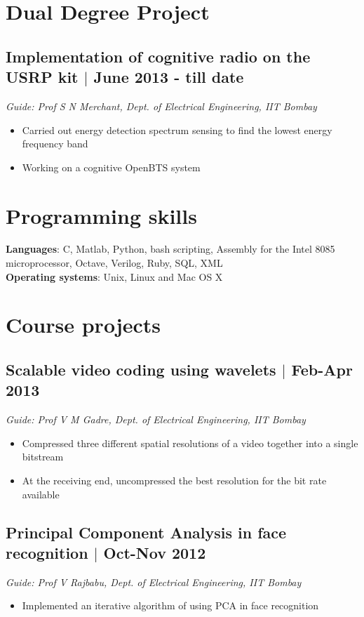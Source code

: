 \documentclass[11pt]{article}
\begin{document}
\setlength{\parindent}{0pt}


\vspace*{5\baselineskip}

\section*{Dual Degree Project}
\subsection*{Implementation of cognitive radio on the USRP kit $\vert$  June 2013 - till date}
\emph{Guide: Prof S N Merchant, Dept. of Electrical Engineering, IIT Bombay} 
\begin{itemize}
\item Carried out energy detection spectrum sensing to find the lowest energy frequency band   
\item Working on a cognitive OpenBTS system 
\end{itemize}

\section*{Programming skills}
\textbf{Languages}: C, Matlab, Python, bash scripting, Assembly for the Intel 8085 microprocessor, Octave, Verilog, Ruby, SQL, XML  \\
\textbf{Operating systems}: Unix, Linux and Mac OS X


\section*{Course projects}
\subsection*{Scalable video coding using wavelets $\vert$  Feb-Apr 2013}
\emph{Guide: Prof V M Gadre, Dept. of Electrical Engineering, IIT Bombay} 
\begin{itemize} 
\item Compressed three different spatial resolutions of a video together into a single bitstream  
\item At the receiving end, uncompressed the best resolution for the bit rate available 
\end{itemize}

\subsection*{Principal Component Analysis in face recognition $\vert$  Oct-Nov 2012} 
\emph{Guide: Prof V Rajbabu, Dept. of Electrical Engineering, IIT Bombay}  
\begin{itemize}
\item Implemented an iterative algorithm of using PCA in face recognition  
\end{itemize}
\end{document}
